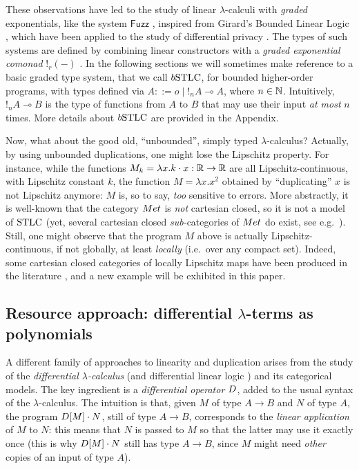 These observations have led to the study of linear $\lambda$-calculi with \emph{graded} exponentials, like the system $\mathsf{Fuzz}$ \cite{Reed2010}, inspired from Girard's Bounded Linear Logic \cite{Girard92tcs}, which have been applied to the study of differential privacy \cite{Gaboardi2013, Gaboardi2017}. The types of such systems are defined by combining linear constructors with a \emph{graded exponential comonad} $!_{r}(-)$ \cite{Katsumata2018}.
In the following sections we will sometimes make reference to a basic graded type system, that we call $\BSTLC$, for bounded higher-order programs, with types defined via $A::= o  \mid   !_{n}A\multimap A  $, 
where $n\in \mathbb{N}$. Intuitively, $!_{ n}A\multimap B$ is the type of functions from $A$ to $B$ that may use their input \emph{at most} $n$ times. More details about $\BSTLC$ are provided in the Appendix.


Now, what about the good old, ``unbounded'', simply typed $\lambda$-calculus? Actually, by using unbounded duplications, one might lose the Lipschitz property. For instance, while the functions $M_{k}=\lambda x. k\cdot x: \mathbb{R}\to \mathbb{R}$ are all Lipschitz-continuous, with Lipschitz constant $k$, the function $M=\lambda x.x^{2}$ obtained by ``duplicating'' $x$ is not Lipschitz anymore: $M$ is, so to say, \emph{too} sensitive to errors. 
More abstractly, it is well-known that the category $\Met$ is \emph{not} cartesian closed, so it is not a model of $\mathrm{STLC}$ (yet, several cartesian closed \emph{sub-}categories of $\Met$ do exist, see e.g.~\cite{Clementino2006, PistoneFSCD2022}).
Still, one might observe that the program $M$ above is actually Lipschitz-continuous, if not globally, at least \emph{locally} (i.e.~over any compact set). Indeed, some cartesian closed categories of locally Lipschitz maps have been produced in the literature \cite{Ehrhard2011, PistoneLICS}, and a new example will be exhibited in this paper.


\subsection{Resource approach: differential $\lambda$-terms as polynomials}

A different family of approaches to linearity and duplication arises from the study of the \emph{differential $\lambda$-calculus} \cite{difflambda} (and differential linear logic \cite{dill}) and its categorical models. 
The key ingredient is a \emph{differential operator} $\Der$,  added to the usual syntax of the $\lambda$-calculus. The intuition is that, given $M$ of type $A\to B$ and $N$ of type $A$, the program $\Der[M]\cdot N$, still of type $A\to B$, corresponds to the \emph{linear application} of $M$ to $N$: this means that $N$ is passed to $M$ so that the latter may use it exactly once (this is why $\Der[M]\cdot N$ still has type $A\to B$, since $M$ might need \emph{other} copies of an input of type $A$). 

